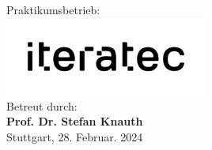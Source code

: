 \begin{titlepage}
\begin{center}
        \normalsize
        \vspace{0.8cm}
        Praktikumsbetrieb:\\ 
        \large
        \includegraphics[width=0.5\textwidth]{figures/iteratec-Logo.png}\\
        \vspace{0.3cm}
        \normalsize
        Betreut durch:\> \\ 
        \large
        \textbf{Prof. Dr. Stefan Knauth} \\
        \normalsize
        \vspace{0.5cm}
        Stuttgart, 28. Februar. 2024\\
    \end{center}
\end{titlepage}